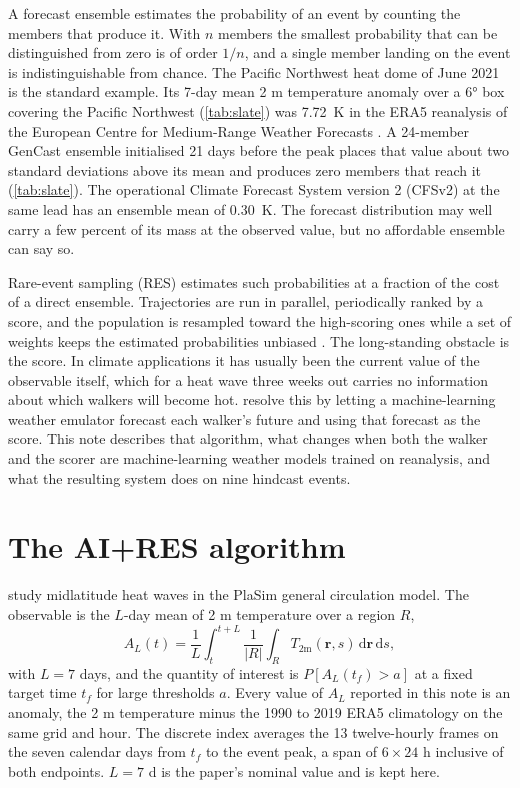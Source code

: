 \documentclass[10pt,twocolumn]{article}
\newcommand{\AL}{A_L}
\newcommand{\Tm}{T_{2\mathrm{m}}}
\begin{document}
A forecast ensemble estimates the probability of an event by counting the members that produce it. With $n$ members the smallest probability that can be distinguished from zero is of order $1/n$, and a single member landing on the event is indistinguishable from chance. The Pacific Northwest heat dome of June 2021 is the standard example. Its 7-day mean 2 m temperature anomaly over a 6\si{\degree} box covering the Pacific Northwest (\cref{tab:slate}) was \SI{+7.72}{K} in the ERA5 reanalysis of the European Centre for Medium-Range Weather Forecasts \citep{hersbach2020era5}. A 24-member GenCast ensemble \citep{price2025gencast} initialised 21 days before the peak places that value about two standard deviations above its mean and produces zero members that reach it (\cref{tab:slate}). The operational Climate Forecast System version 2 (CFSv2) \citep{saha2014cfsv2} at the same lead has an ensemble mean of \SI{+0.30}{K}. The forecast distribution may well carry a few percent of its mass at the observed value, but no affordable ensemble can say so.

Rare-event sampling (RES) estimates such probabilities at a fraction of the cost of a direct ensemble. Trajectories are run in parallel, periodically ranked by a score, and the population is resampled toward the high-scoring ones while a set of weights keeps the estimated probabilities unbiased \citep{delmoral2005genealogical,ragone2018heatwaves}. The long-standing obstacle is the score. In climate applications it has usually been the current value of the observable itself, which for a heat wave three weeks out carries no information about which walkers will become hot. \citet{lancelin2026airres} resolve this by letting a machine-learning weather emulator forecast each walker's future and using that forecast as the score. This note describes that algorithm, what changes when both the walker and the scorer are machine-learning weather models trained on reanalysis, and what the resulting system does on nine hindcast events.

\section{The AI+RES algorithm}
\label{sec:algo}

\citet{lancelin2026airres} study midlatitude heat waves in the PlaSim general circulation model. The observable is the $L$-day mean of 2 m temperature over a region $R$,
\begin{equation}
  \AL(t) = \frac{1}{L}\int_{t}^{t+L}\frac{1}{|R|}\int_{R} \Tm(\mathbf{r},s)\,\mathrm{d}\mathbf{r}\,\mathrm{d}s ,
  \label{eq:AL}
\end{equation}
with $L = 7$ days, and the quantity of interest is $P[\AL(t_f) > a]$ at a fixed target time $t_f$ for large thresholds $a$. Every value of $\AL$ reported in this note is an anomaly, the 2 m temperature minus the 1990 to 2019 ERA5 climatology on the same grid and hour. The discrete index averages the 13 twelve-hourly frames on the seven calendar days from $t_f$ to the event peak, a span of $6\times 24$ h inclusive of both endpoints. $L = 7$ d is the paper's nominal value and is kept here.
\end{document}
